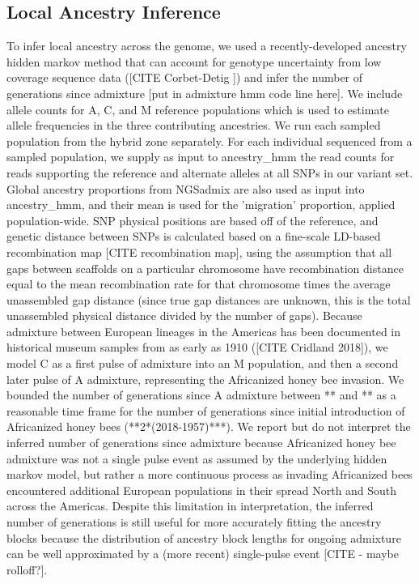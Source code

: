 \documentclass[12pt]{report}
\begin{document}
\subsection{Local Ancestry Inference}
To infer local ancestry across the genome, we used a recently-developed ancestry hidden markov method that can account for genotype uncertainty from low coverage sequence data ([CITE Corbet-Detig ]) and infer the number of generations since admixture [put in admixture hmm code line here]. We include allele counts for A, C, and M reference populations which is used to estimate allele frequencies in the three contributing ancestries. We run each sampled population from the hybrid zone separately. For each individual sequenced from a sampled population, we supply as input to ancestry\_hmm the read counts for reads supporting the reference and alternate alleles at all SNPs in our variant set. Global ancestry proportions from NGSadmix are also used as input into ancestry\_hmm, and their mean is used for the 'migration' proportion, applied population-wide. SNP physical positions are based off of the reference, and genetic distance between SNPs is calculated based on a fine-scale LD-based recombination map [CITE recombination map], using the assumption that all gaps between scaffolds on a particular chromosome have recombination distance equal to the mean recombination rate for that chromosome times the average unassembled gap distance (since true gap distances are unknown, this is the total unassembled physical distance divided by the number of gaps). Because admixture between European lineages in the Americas has been documented in historical museum samples from as early as 1910 ([CITE Cridland 2018]), we model C as a first pulse of admixture into an M population, and then a second later pulse of A admixture, representing the Africanized honey bee invasion. We bounded the number of generations since A admixture between ** and ** as a reasonable time frame for the number of generations since initial introduction of Africanized honey bees (**2*(2018-1957)***). We report but do not interpret the inferred number of generations since admixture because Africanized honey bee admixture was not a single pulse event as assumed by the underlying hidden markov model, but rather a more continuous process as invading Africanized bees encountered additional European populations in their spread North and South across the Americas. Despite this limitation in interpretation, the inferred number of generations is still useful for more accurately fitting the ancestry blocks because the distribution of ancestry block lengths for ongoing admixture can be well approximated by a (more recent) single-pulse event [CITE - maybe rolloff?].
\end{document}
